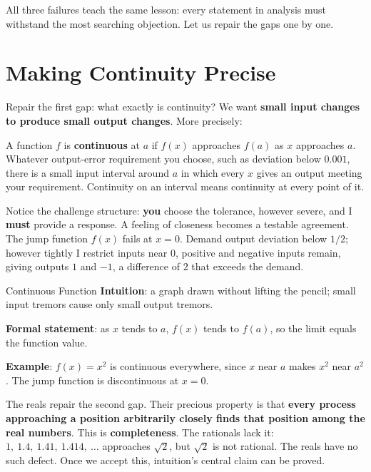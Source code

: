 All three failures teach the same lesson: every statement in analysis must withstand the most searching objection. Let us repair the gaps one by one.

\section{Making Continuity Precise}

Repair the first gap: what exactly is continuity? We want \textbf{small input changes to produce small output changes}. More precisely:

\begin{dingyi}
A function $f$ is \textbf{continuous} at $a$ if $f(x)$ approaches $f(a)$ as $x$ approaches $a$. Whatever output-error requirement you choose, such as deviation below $0.001$, there is a small input interval around $a$ in which every $x$ gives an output meeting your requirement. Continuity on an interval means continuity at every point of it.
\end{dingyi}

Notice the challenge structure: \textbf{you} choose the tolerance, however severe, and I \textbf{must} provide a response. A feeling of closeness becomes a testable agreement. The jump function $f(x)$ fails at $x=0$. Demand output deviation below $1/2$; however tightly I restrict inputs near $0$, positive and negative inputs remain, giving outputs $1$ and $-1$, a difference of $2$ that exceeds the demand.

\begin{shuyu}{Continuous Function}
\textbf{Intuition}: a graph drawn without lifting the pencil; small input tremors cause only small output tremors.

\textbf{Formal statement}: as $x$ tends to $a$, $f(x)$ tends to $f(a)$, so the limit equals the function value.

\textbf{Example}: $f(x)=x^2$ is continuous everywhere, since $x$ near $a$ makes $x^2$ near $a^2$. The jump function is discontinuous at $x=0$.
\end{shuyu}

The reals repair the second gap. Their precious property is that \textbf{every process approaching a position arbitrarily closely finds that position among the real numbers}. This is \textbf{completeness}. The rationals lack it: $1,\ 1.4,\ 1.41,\ 1.414,\ \dots$ approaches $\sqrt{2}$, but $\sqrt{2}$ is not rational. The reals have no such defect. Once we accept this, intuition's central claim can be proved.

